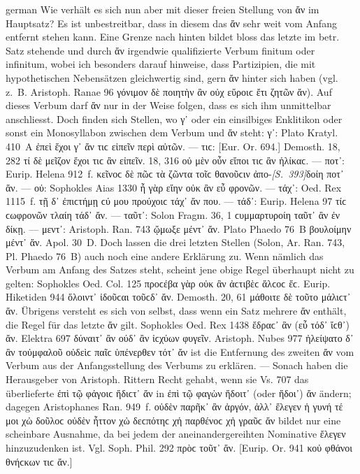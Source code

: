 \begin{otherlanguage*}{german}
Wie verhält es sich nun aber mit dieser freien Stellung von ἄν im Hauptsatz? Es ist unbestreitbar, dass in diesem das ἄν sehr weit vom Anfang entfernt stehen kann. Eine Grenze nach hinten bildet bloss das letzte im betr. Satz stehende und durch ἄν irgendwie qualifizierte Verbum finitum oder infinitum, wobei ich besonders darauf hinweise, dass Partizipien, die mit hypothetischen Nebensätzen gleichwertig sind, gern ἄν  hinter sich haben (vgl. z.~B. Aristoph. Ranae 96 γόνιμον δὲ ποιητὴν ἂν οὐχ εὕροιϲ ἔτι ζητῶν ἄν). Auf dieses Verbum darf ἄν  nur in der Weise folgen, dass es sich ihm unmittelbar anschliesst. Doch finden sich Stellen, wo γ᾽ oder ein einsilbiges Enklitikon oder sonst ein Monosyllabon zwischen dem Verbum und ἄν steht: γ᾽: Plato Kratyl. 410~A ἐπεὶ ἔχοι γ᾽ ἄν τιϲ εἰπεῖν περὶ αὐτῶν. — τιϲ: [Eur. Or. 694.] Demosth. 18, 282 τί δὲ μεῖζον ἔχοι τιϲ ἂν εἰπεῖν. 18, 316 οὐ μὲν οὖν εἴποι τιϲ ἂν ἡλίκαϲ. — ποτ᾽: Eurip. Helena 912~f. κεῖνοϲ δὲ πῶϲ τὰ ζῶντα τοῖϲ θανοῦϲιν ἀπο-\hypertarget{p393}{\emph{[S.~393]}}\label{p393}δοίη ποτ᾽ ἄν. — οὐ: Sophokles Aias 1330 ἦ γὰρ εἴην οὐκ ἂν εὖ φρονῶν. — τάχ᾽: Oed. Rex 1115~f. τῇ δ᾽ ἐπιϲτήμῃ ϲύ μου προύχοιϲ τάχ᾽ ἄν που. — τάδ᾽: Eurip. Helena 97 τίϲ ϲωφρονῶν τλαίη τάδ᾽ ἄν. — ταῦτ᾽: Solon Fragm. 36, 1 ϲυμμαρτυροίη ταῦτ᾽ ἂν ἐν δίκῃ. — μεντ᾽: Aristoph. Ran. 743 ᾤμωξε μέντ᾽ ἄν. Plato Phaedo 76~Β βουλοίμην μέντ᾽ ἄν. Apol. 30~D. Doch lassen die drei letzten Stellen (Solon, Ar. Ran. 743, Pl. Phaedo 76~B) auch noch eine andere Erklärung zu. Wenn nämlich das Verbum am Anfang des Satzes steht, scheint jene obige Regel überhaupt nicht zu gelten: Sophokles Oed. Col. 125 προϲέβα γὰρ οὐκ ἂν ἀϲτιβὲϲ ἄλϲοϲ ἔϲ. Eurip. Hiketiden 944 ὄλοιντ᾽ ἰδοῦϲαι τοῦϲδ᾽ ἄν. Demosth. 20, 61 μάθοιτε δὲ τοῦτο μάλιϲτ᾽ ἄν. Übrigens versteht es sich von selbst, dass wenn ein Satz mehrere ἄν enthält, die Regel für das letzte ἄν gilt. Sophokles Oed. Rex 1438 ἔδραϲ᾽ ἂν (εὖ τόδ᾽ ἴϲθ᾽) ἄν. Elektra 697 δύναιτ᾽ ἂν ούδ᾽ ἂν ἰϲχύων φυγεῖν. Aristoph. Nubes 977 ἠλείψατο δ᾽ ἂν τοὐμφαλοῦ οὐδεὶϲ παῖϲ ὑπένερθεν τότ᾽ ἄν ist die Entfernung des zweiten ἄν vom Verbum aus der Anfangsstellung des Verbums zu erklären. — Sonach haben die Herausgeber von Aristoph. Rittern Recht gehabt, wenn sie Vs. 707 das überlieferte ἐπὶ τῷ φάγοιϲ ἥδιϲτ᾽ ἄν in ἐπὶ τῷ φαγὼν ἥδοιτ᾽ (oder ἥδοι᾽) ἄν ändern; dagegen Aristophanes Ran. 949~f. οὐδὲν παρῆκ᾽ ἂν ἀργόν, ἀλλ᾽ ἔλεγεν ἡ γυνή τέ μοι χὠ δοῦλοϲ οὐδὲν ἧττον χὠ δεϲπότηϲ χἠ παρθένοϲ χἠ γραῦϲ ἄν bildet nur eine scheinbare Ausnahme, da bei jedem der aneinandergereihten Nominative ἔλεγεν hinzuzudenken ist. Vgl. Soph. Phil. 292 πρὸϲ τοῦτ᾽ ἄν. [Eurip. Or. 941 κοὐ φθάνοι θνήϲκων τιϲ ἄν.]


\end{otherlanguage*}
